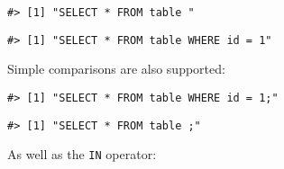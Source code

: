 \documentclass[]{article}
\newenvironment{Shaded}{\begin{snugshade}}{\end{snugshade}}
\newcommand{\DataTypeTok}[1]{\textcolor[rgb]{0.13,0.29,0.53}{#1}}
\newcommand{\DecValTok}[1]{\textcolor[rgb]{0.00,0.00,0.81}{#1}}
\newcommand{\KeywordTok}[1]{\textcolor[rgb]{0.13,0.29,0.53}{\textbf{#1}}}
\newcommand{\NormalTok}[1]{#1}
\newcommand{\OperatorTok}[1]{\textcolor[rgb]{0.81,0.36,0.00}{\textbf{#1}}}
\newcommand{\OtherTok}[1]{\textcolor[rgb]{0.56,0.35,0.01}{#1}}
\newcommand{\StringTok}[1]{\textcolor[rgb]{0.31,0.60,0.02}{#1}}
\begin{document}
\begin{verbatim}
#> [1] "SELECT * FROM table "
\end{verbatim}

\begin{Shaded}
\end{Shaded}

\begin{verbatim}
#> [1] "SELECT * FROM table WHERE id = 1"
\end{verbatim}

Simple comparisons are also supported:

\begin{Shaded}
\end{Shaded}

\begin{verbatim}
#> [1] "SELECT * FROM table WHERE id = 1;"
\end{verbatim}

\begin{Shaded}
\end{Shaded}

\begin{verbatim}
#> [1] "SELECT * FROM table ;"
\end{verbatim}

As well as the \texttt{IN} operator:

\begin{Shaded}
\end{Shaded}
\end{document}
